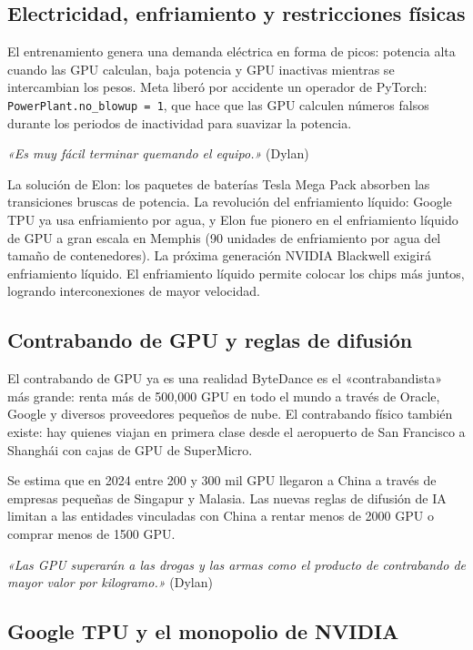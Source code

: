 \documentclass[a4paper]{article}
\begin{document}
\subsection{Electricidad, enfriamiento y restricciones físicas}

El entrenamiento genera una demanda eléctrica en forma de picos: potencia alta cuando las GPU calculan, baja potencia y GPU inactivas mientras se intercambian los pesos. Meta liberó por accidente un operador de PyTorch: \texttt{PowerPlant.no\_blowup = 1}, que hace que las GPU calculen números falsos durante los periodos de inactividad para suavizar la potencia.

\textit{«Es muy fácil terminar quemando el equipo.»} (Dylan)

La solución de Elon: los paquetes de baterías Tesla Mega Pack absorben las transiciones bruscas de potencia. La revolución del enfriamiento líquido: Google TPU ya usa enfriamiento por agua, y Elon fue pionero en el enfriamiento líquido de GPU a gran escala en Memphis (90 unidades de enfriamiento por agua del tamaño de contenedores). La próxima generación NVIDIA Blackwell exigirá enfriamiento líquido. El enfriamiento líquido permite colocar los chips más juntos, logrando interconexiones de mayor velocidad.

\subsection{Contrabando de GPU y reglas de difusión}

\begin{warningbox}{El contrabando de GPU ya es una realidad}
ByteDance es el «contrabandista» más grande: renta más de 500,000 GPU en todo el mundo a través de Oracle, Google y diversos proveedores pequeños de nube. El contrabando físico también existe: hay quienes viajan en primera clase desde el aeropuerto de San Francisco a Shanghái con cajas de GPU de SuperMicro.

Se estima que en 2024 entre 200 y 300 mil GPU llegaron a China a través de empresas pequeñas de Singapur y Malasia. Las nuevas reglas de difusión de IA limitan a las entidades vinculadas con China a rentar menos de 2000 GPU o comprar menos de 1500 GPU.

\textit{«Las GPU superarán a las drogas y las armas como el producto de contrabando de mayor valor por kilogramo.»} (Dylan)
\end{warningbox}

\subsection{Google TPU y el monopolio de NVIDIA}
\end{document}
